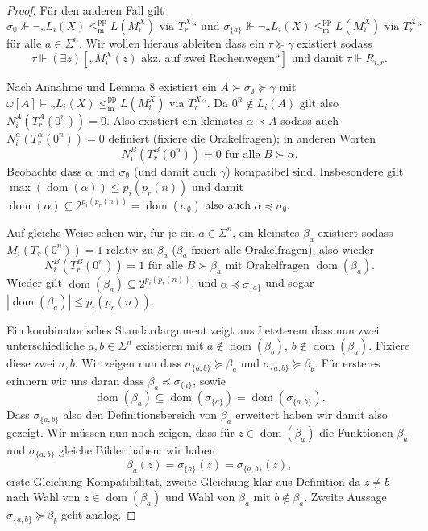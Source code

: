 \documentclass[nofonts]{uebung}
\theoremstyle{definition}
\DeclareMathOperator{\dom}{dom}
\def\leqmpp{\ensuremath{\leq_\mathrm{m}^\mathrm{pp}}}
\begin{document}
\begin{proof}
    Für den anderen Fall gilt 
    \[ \sigma_\emptyset \not\Vdash \neg„L_{i}(X)\leqmpp L(M_i^X)\text{ via }T^X_r“ \text{ und }\sigma_{\{a\}} \not\Vdash \neg„L_{i}(X)\leqmpp L(M_i^X)\text{ via }T^X_r“ \]
    für alle $a\in\Sigma^n$.
    Wir wollen hieraus ableiten dass ein $\tau\succeq\gamma$ existiert sodass
    \[ \tau\Vdash (\exists z)[\text{„$M_i^X(z)$ akz. auf zwei Rechenwegen“}] \text{ und damit } \tau\Vdash  R_{i,r}. \]

    Nach Annahme und Lemma 8 existiert ein $A\succ\sigma_\emptyset\succeq \gamma$ mit $\omega[A] \vDash „L_{i}(X)\leqmpp L(M_i^X)\text{ via }T^X_r“$.
    Da $0^n\not\in L_i(A)$ gilt also $N^A_i(T_r^A(0^n))=0$.
    Also existiert ein kleinstes $\alpha\prec A$ sodass auch $N^\alpha_i(T_r^\alpha(0^n))=0$ definiert (fixiere die Orakelfragen); in anderen Worten
    \begin{equation}
        N^B_i(T_r^B(0^n))=0 \text{ für alle }B\succ\alpha.\label{eq:up-rejects}
    \end{equation}
    Beobachte dass $\alpha$ und $\sigma_\emptyset$ (und damit auch $\gamma$) kompatibel sind.
    Insbesondere gilt $\max(\dom(\alpha))\leq p_i(p_r(n))$ und damit $\dom(\alpha)\subseteq 2^{p_i(p_r(n))}=\dom(\sigma_\emptyset)$ also auch $\alpha\preceq \sigma_\emptyset$.

    Auf gleiche Weise sehen wir, für je ein $a\in\Sigma^n$, ein kleinstes $\beta_a$ existiert sodass $M_i(T_r(0^n))=1$ relativ zu $\beta_a$ ($\beta_a$ fixiert alle Orakelfragen), also wieder
    \begin{equation}
        N^B_i(T_r^B(0^n))=1 \text{ für alle $B\succ\beta_a$ mit Orakelfragen $\dom(\beta_a)$}.\label{eq:up-accepts}
    \end{equation}
    Wieder gilt $\dom(\beta_a)\subseteq 2^{p_i(p_r(n))}$, und $\alpha\preceq \sigma_{\{a\}}$ und sogar $|\dom(\beta_a)|\leq p_i(p_r(n))$.

    Ein kombinatorisches Standardargument zeigt aus Letzterem dass nun zwei unterschiedliche $a,b\in \Sigma^n$ existieren mit $a\not\in \dom(\beta_b)$, $b\not\in \dom(\beta_a)$. Fixiere diese zwei $a,b$.
    Wir zeigen nun dass $\sigma_{\{a,b\}} \succeq \beta_a$ und $\sigma_{\{a,b\}} \succeq \beta_b$.
    Für ersteres erinnern wir uns daran dass $\beta_a\preceq\sigma_{\{a\}}$, sowie
    \[ \dom(\beta_a)\subseteq \dom(\sigma_{\{a\}})=\dom(\sigma_{\{a,b\}}). \]
    Dass $\sigma_{\{a,b\}}$ also den Definitionsbereich von $\beta_a$ erweitert haben wir damit also gezeigt. Wir müssen nun noch zeigen, dass für $z\in\dom(\beta_a)$ die Funktionen $\beta_a$ und $\sigma_{\{a,b\}}$ gleiche Bilder haben: wir haben
    \[ \beta_a(z)=\sigma_{\{a\}}(z)=\sigma_{\{a,b\}}(z), \]
    erste Gleichung Kompatibilität, zweite Gleichung klar aus Definition da $z\neq b$ nach Wahl von $z\in\dom(\beta_a)$ und Wahl von $\beta_a$ mit $b\not\in \beta_a$.
    Zweite Aussage $\sigma_{\{a,b\}} \succeq \beta_b$ geht analog.


\end{proof}
\end{document}

